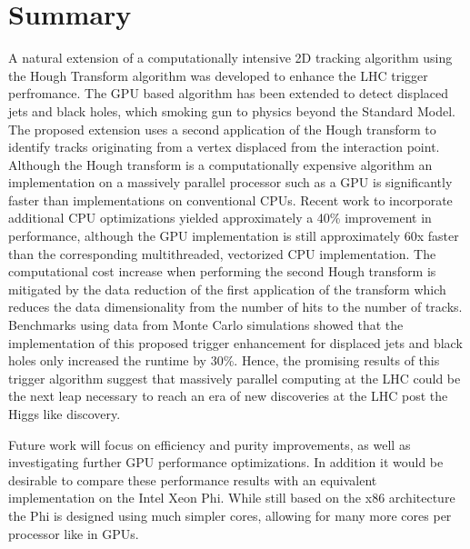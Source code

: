 \documentclass{JINST}
\begin{document}
\section{Summary}

A natural extension of a computationally intensive 2D tracking algorithm  using the Hough Transform algorithm was developed to enhance the LHC trigger perfromance.
The GPU based algorithm  has been extended to detect displaced jets and black holes, which smoking gun to physics beyond the Standard Model.  The proposed extension uses 
a second application of the Hough transform to identify tracks originating from a vertex displaced from the interaction point.  Although the Hough transform is a 
computationally expensive algorithm an implementation on a massively parallel processor such as a GPU is significantly faster than implementations on conventional CPUs.  Recent work to incorporate additional CPU optimizations yielded approximately a 40\% improvement in performance, although the GPU implementation is still approximately 60x faster 
than the corresponding multithreaded, vectorized CPU implementation.  The computational cost increase when performing the second Hough transform is mitigated by the data reduction of the first application of the transform which reduces the data dimensionality from the number of hits to the number of tracks.  Benchmarks using data from Monte Carlo simulations showed that the implementation of this proposed trigger enhancement for displaced jets and black holes only increased the runtime by 30\%. Hence, the promising results of this trigger algorithm suggest that massively parallel computing at the LHC could be the next leap necessary 
to reach an era of new discoveries at the LHC post the Higgs like discovery. 

Future work will focus on efficiency and purity improvements, as well as investigating further GPU performance optimizations.  In addition it would be desirable to compare these performance results with an equivalent implementation on the Intel Xeon Phi.  While still based on the x86 architecture the Phi is designed using much simpler cores, allowing for many more cores per processor like in GPUs.
\end{document}
